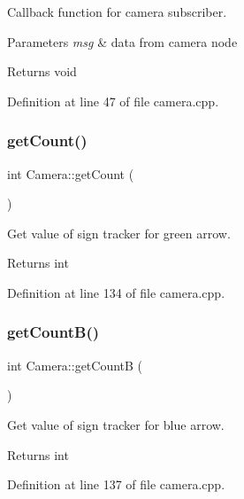 Callback function for camera subscriber. 


\begin{DoxyParams}{Parameters}
{\em msg} & data from camera node \\
\hline
\end{DoxyParams}
\begin{DoxyReturn}{Returns}
void 
\end{DoxyReturn}


Definition at line 47 of file camera.\+cpp.

\mbox{\label{class_camera_ac33d3b84891fdc56e4cce90e59be1905}} 
\subsubsection{\texorpdfstring{get\+Count()}{getCount()}}
{\footnotesize\ttfamily int Camera\+::get\+Count (\begin{DoxyParamCaption}{ }\end{DoxyParamCaption})}



Get value of sign tracker for green arrow. 

\begin{DoxyReturn}{Returns}
int 
\end{DoxyReturn}


Definition at line 134 of file camera.\+cpp.

\mbox{\label{class_camera_ae345bbfa5530387acf5143a3e70bf103}} 
\subsubsection{\texorpdfstring{get\+Count\+B()}{getCountB()}}
{\footnotesize\ttfamily int Camera\+::get\+CountB (\begin{DoxyParamCaption}{ }\end{DoxyParamCaption})}



Get value of sign tracker for blue arrow. 

\begin{DoxyReturn}{Returns}
int 
\end{DoxyReturn}


Definition at line 137 of file camera.\+cpp.

